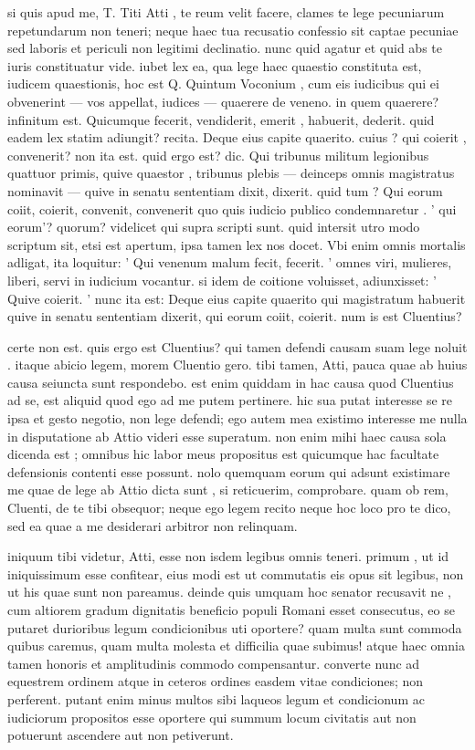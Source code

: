  si quis apud me, T. Titi Atti , te reum velit facere, clames te lege pecuniarum repetundarum non teneri; neque haec tua recusatio confessio sit captae pecuniae sed laboris et periculi non legitimi declinatio. nunc quid agatur et quid abs te iuris constituatur vide. iubet lex ea, qua lege haec quaestio constituta est, iudicem quaestionis, hoc est Q. Quintum Voconium , cum eis iudicibus qui ei obvenerint — vos appellat, iudices — quaerere de veneno. in quem quaerere? infinitum est. Quicumque fecerit, vendiderit, emerit , habuerit, dederit. quid eadem lex statim adiungit? recita. Deque eius capite quaerito. cuius ? qui coierit , convenerit? non ita est. quid ergo est? dic. Qui tribunus militum legionibus quattuor primis, quive quaestor , tribunus plebis — deinceps omnis magistratus nominavit — quive in senatu sententiam dixit, dixerit. quid tum ? Qui eorum coiit, coierit, convenit, convenerit quo quis iudicio publico condemnaretur . ' qui eorum'? quorum? videlicet qui supra scripti sunt. quid intersit utro modo scriptum sit, etsi est apertum, ipsa tamen lex nos docet. Vbi enim omnis mortalis adligat, ita loquitur: ' Qui venenum malum fecit, fecerit. ' omnes viri, mulieres, liberi, servi in iudicium vocantur. si idem de coitione voluisset, adiunxisset: ' Quive coierit. ' nunc ita est: Deque eius capite quaerito qui magistratum habuerit quive in senatu sententiam dixerit, qui eorum coiit, coierit. num is est Cluentius?

 certe non est. quis ergo est Cluentius? qui tamen defendi causam suam lege noluit . itaque abicio legem, morem Cluentio gero. tibi tamen, Atti, pauca quae ab huius causa seiuncta sunt respondebo. est enim quiddam in hac causa quod Cluentius ad se, est aliquid quod ego ad me putem pertinere. hic sua putat interesse se re ipsa et gesto negotio, non lege defendi; ego autem mea existimo interesse me nulla in disputatione ab Attio videri esse superatum. non enim mihi haec causa sola dicenda est ; omnibus hic labor meus propositus est quicumque hac facultate defensionis contenti esse possunt. nolo quemquam eorum qui adsunt existimare me quae de lege ab Attio dicta sunt , si reticuerim, comprobare. quam ob rem, Cluenti, de te tibi obsequor; neque ego legem recito neque hoc loco pro te dico, sed ea quae a me desiderari arbitror non relinquam.

 iniquum tibi videtur, Atti, esse non isdem legibus omnis teneri. primum , ut id iniquissimum esse confitear, eius modi est ut commutatis eis opus sit legibus, non ut his quae sunt non pareamus. deinde quis umquam hoc senator recusavit ne , cum altiorem gradum dignitatis beneficio populi Romani esset consecutus, eo se putaret durioribus legum condicionibus uti oportere? quam multa sunt commoda quibus caremus, quam multa molesta et difficilia quae subimus! atque haec omnia tamen honoris et amplitudinis commodo compensantur. converte nunc ad equestrem ordinem atque in ceteros ordines easdem vitae condiciones; non perferent. putant enim minus multos sibi laqueos legum et condicionum ac iudiciorum propositos esse oportere qui summum locum civitatis aut non potuerunt ascendere aut non petiverunt.

